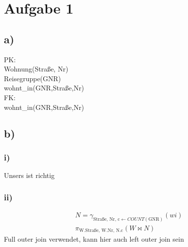 \section*{Aufgabe 1}
\subsection*{a)}
PK: \\
Wohnung(Straße, Nr) \\
Reisegruppe(GNR) \\
wohnt\_in(GNR,Straße,Nr) \\
FK: \\
wohnt\_in(GNR,Straße,Nr)
\subsection*{b)}
\subsubsection*{i)}
Unsers ist richtig
\subsubsection*{ii)}
\begin{align*}
&N = \gamma _{ \text{Straße, Nr, c} \leftarrow COUNT(\text{GNR}) }(wi) \\
&\pi _{ \text{W.Straße, W.Nr, N.c} } (W \Join N)  
\end{align*}
Full outer join verwendet, kann hier auch left outer join sein